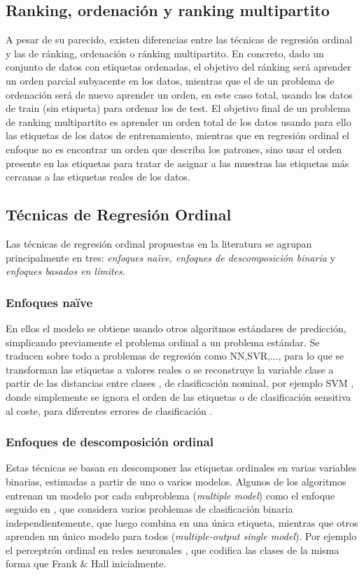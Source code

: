 \subsection{Ranking, ordenación y ranking multipartito}
A pesar de su parecido, existen diferencias entre las técnicas de regresión ordinal y las de ránking, ordenación o ránking multipartito. En concreto, dado un conjunto de datos con etiquetas ordenadas, el objetivo del ránking será aprender un orden parcial subyacente en los datos, mientras que el de un problema de ordenación será de nuevo aprender un orden, en este caso total, usando los datos de train (sin etiqueta) para ordenar los de test. El objetivo final de un problema de ranking multipartito es aprender un orden total de los datos usando para ello las etiquetas de los datos de entrenamiento, mientras que en regresión ordinal el enfoque no es encontrar un orden que describa los patrones, sino usar el orden presente en las etiquetas para tratar de asignar a las muestras las etiquetas más cercanas a las etiquetas reales de los datos. 

\subsection{Técnicas de Regresión Ordinal}
Las técnicas de regresión ordinal propuestas en la literatura se agrupan principalmente en tres: \textit{enfoques naïve, enfoques de descomposición binaria} y \textit{enfoques basados en límites}. 
\subsubsection{Enfoques naïve}
En ellos el modelo se obtiene usando otros algoritmos estándares de predicción, simplicando previamente el problema ordinal a un problema estándar. Se traducen sobre todo a problemas de regresión como NN,SVR,..., para lo que se transforman las etiquetas a valores reales \cite{Torra2006} o se reconstruye la variable clase a partir de las distancias entre clases \cite{Sanchez2013}, de clasificación nominal, por ejemplo SVM \cite{Vapnik2015}, donde simplemente se ignora el orden de las etiquetas o de clasificación sensitiva al coste, para diferentes errores de clasificación \cite{unknown}.  
\subsubsection{Enfoques de descomposición ordinal}
Estas técnicas se basan en descomponer las etiquetas ordinales en varias variables binarias, estimadas a partir de uno o varios modelos. Algunos de los algoritmos entrenan un modelo por cada subproblema (\textit{multiple model}) como el enfoque seguido en \cite{Hall}, que considera varios problemas de clasificación binaria independientemente, que luego combina en una única etiqueta, mientras que otros aprenden un único modelo para todos (\textit{multiple-output single model}). Por ejemplo el perceptrón ordinal en redes neuronales \cite{cheng2008neural}, que codifica las clases de la misma forma que Frank \& Hall \cite{Hall} inicialmente.
